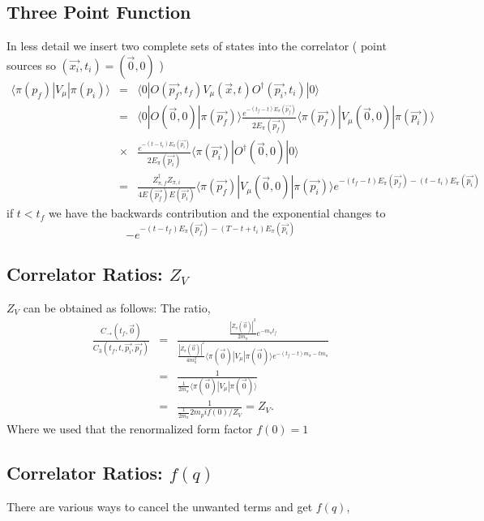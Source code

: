 \documentclass[3p,preprint]{elsarticle}
\begin{document}
\subsection{Three Point Function}

In less detail we insert two complete sets of states into the correlator ( point sources so $(\vec{x_i}, t_i) = (\vec{0}, 0)$ )
\begin{eqnarray}
\langle \pi(p_f) | V_\mu | \pi(p_i) \rangle &=& \langle 0| O(\vec{p_f}, t_f) V_\mu(\vec{x}, t) O^\dagger(\vec{p_i}, t_i) |0\rangle \\
 &=& \langle 0| O(\vec{0}, 0) | \pi(\vec{p_f}) \rangle \frac{e^{-(t_f - t) E_\pi(\vec{p_f}) }}{2 E_\pi(\vec{p_f}) } \langle \pi(\vec{p_f}) | V_\mu(\vec{0}, 0) | \pi(\vec{p_i}) \rangle \\ &\times& \frac{e^{-(t - t_i) E_\pi(\vec{p_i}) }} {2 E_\pi(\vec{p_i}) } \langle \pi(\vec{p_i}) | O^\dagger(\vec{0}, 0) |0 \rangle \\ \nonumber
&=&  \frac{ Z_{\pi, f}^\dagger Z_{\pi, i} }{4 E(\vec{p_f}) E(\vec{p_i}) } \langle \pi(\vec{p_f}) | V_\mu(\vec{0}, 0) | \pi(\vec{p_i}) \rangle  e^{-(t_f - t) E_\pi(\vec{p_f}) -(t-t_i) E_\pi(\vec{p_i}) }
\end{eqnarray}
if $t < t_f$ we have the backwards contribution and the exponential changes to 
\begin{equation}
-e^{-(t - t_f) E_\pi(\vec{p_f}) -(T - t + t_i) E_\pi(\vec{p_i}) }
\end{equation}

\subsection{Correlator Ratios: $Z_V$}
$Z_V$ can be obtained as follows: The ratio,
\begin{eqnarray}
\frac{ C_{\rightarrow}(t_f, \vec{0}) }{ C_3(t_f, t, \vec{p_i}, \vec{p_f}) } &=&  
\frac{ \frac{ |Z_\pi( \vec{0} )|^2 }{ 2 m_\pi }   e^{- m_\pi t_f }  }{ \frac{ |Z_\pi( \vec{0} )|^2 }{4 m_\pi^2 } \langle \pi(\vec{0}) | V_\mu | \pi(\vec{0}) \rangle e^{-(t_f - t) m_\pi -t m_\pi } } \\
&=& \frac{ 1  }{ \frac{ 1 }{2 m_\pi } \langle \pi(\vec{0}) | V_\mu | \pi(\vec{0}) \rangle } \\
&=& \frac{ 1  }{ \frac{ 1 }{2 m_\pi } 2 m_pi f(0)/Z_V } = Z_V.
\end{eqnarray}
Where we used that the renormalized form factor $f(0) = 1$

\subsection{Correlator Ratios: $f(q)$}
There are various ways to cancel the unwanted terms and get $f(q)$,
\end{document}
